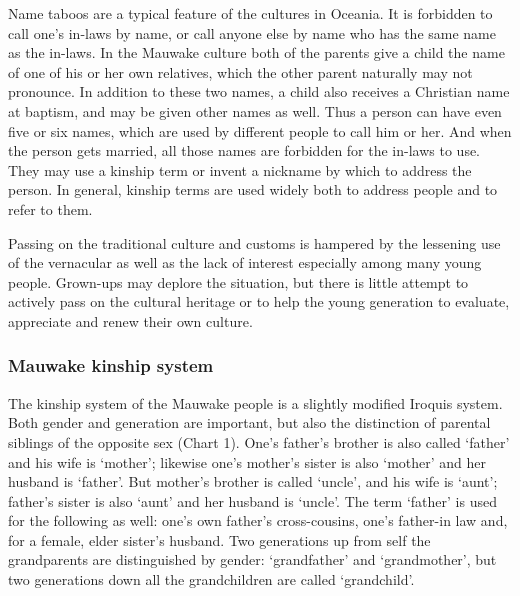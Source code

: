 Name taboos are a typical feature of the cultures in Oceania.  It is forbidden to call one's in-laws by name, or call anyone else by name who has the same name as the in-laws.  In the Mauwake culture both of the parents give a child the name of one of his or her own relatives, which the other parent naturally may not pronounce.  In addition to these two names, a child also receives a Christian name at baptism, and may be given other names as well.  Thus a person can have even five or six names, which are used by different people to call him or her.  And when the person gets married, all those names are forbidden for the in-laws to use.  They may use a kinship term or invent a nickname by which to address the person. In general, kinship terms are used widely both to address people and to refer to them.

Passing on the traditional culture and customs is hampered by the lessening use of the vernacular as well as the lack of interest especially among many young people. Grown-ups may deplore the situation, but there is little attempt to actively pass on the cultural heritage or to help the young generation to evaluate, appreciate and renew their own culture. 





\begin{table}



\caption{}
\end{table}


\subsubsection{Mauwake kinship system}
\hypertarget{RefHeading18541935131865}{}The kinship system of the Mauwake people is a slightly modified Iroquis system. Both gender and generation are important, but also the distinction of parental siblings of the opposite sex (Chart 1). One's father's brother is also called  `father' and his wife is  `mother'; likewise one's mother's sister is also `mother' and her husband is `father'. But mother's brother is called  `uncle', and his wife is  `aunt'; father's sister is also `aunt' and her husband is `uncle'. The term `father' is used for the following as well: one's own father's cross-cousins, one's father-in law and, for a female, elder sister's husband. Two generations up from self the grandparents are distinguished by gender:  `grandfather' and  `grandmother', but two generations down all the grandchildren are called  `grandchild'. 

